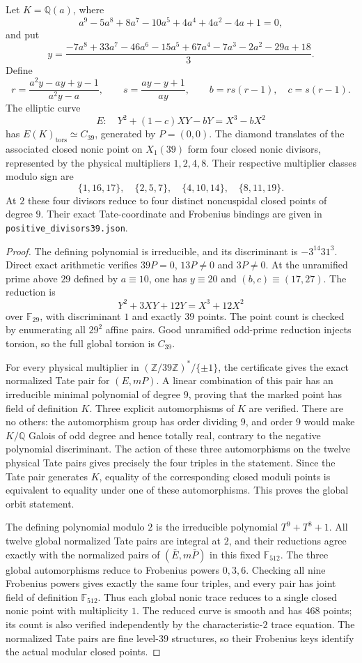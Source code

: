 \begin{lemma}\label{lem:nonic39-positive-witnesses}
Let $K=\mathbb Q(a)$, where
\[
 a^9-5a^8+8a^7-10a^5+4a^4+4a^2-4a+1=0,
\]
and put
\[
 y=\frac{-7a^8+33a^7-46a^6-15a^5+67a^4-7a^3-2a^2-29a+18}{3}.
\]
Define
\[
 r=\frac{a^2y-ay+y-1}{a^2y-a},\qquad
 s=\frac{ay-y+1}{ay},\qquad
 b=rs(r-1),\quad c=s(r-1).
\]
The elliptic curve
\[
 E:\quad Y^2+(1-c)XY-bY=X^3-bX^2
\]
has $E(K)_{\mathrm{tors}}\simeq C_{39}$, generated by $P=(0,0)$.
The diamond translates of the associated closed nonic point on
$X_1(39)$ form four closed nonic divisors, represented by the
physical multipliers $1,2,4,8$.
Their respective multiplier classes modulo sign are
\[
 \{1,16,17\},\quad \{2,5,7\},\quad
 \{4,10,14\},\quad \{8,11,19\}.
\]
At $2$ these four divisors reduce to four distinct noncuspidal closed
points of degree $9$. Their exact Tate-coordinate and Frobenius
bindings are given in \texttt{positive\_divisors39.json}.
\end{lemma}
\begin{proof}
The defining polynomial is irreducible, and its discriminant is
$-3^{14}31^3$. Direct exact arithmetic verifies
$39P=0$, $13P\ne0$ and $3P\ne0$.
At the unramified prime above $29$ defined by $a\equiv10$, one has
$y\equiv20$ and $(b,c)\equiv(17,27)$.
The reduction is
\[
 Y^2+3XY+12Y=X^3+12X^2
\]
over $\mathbb F_{29}$, with discriminant $1$ and exactly $39$ points.
The point count is checked by enumerating all $29^2$ affine pairs.
Good unramified odd-prime reduction injects torsion, so the full
global torsion is $C_{39}$.

For every physical multiplier in
$(\mathbb Z/39\mathbb Z)^*/\{\pm1\}$, the certificate gives the exact
normalized Tate pair for $(E,mP)$. A linear combination of this pair
has an irreducible minimal polynomial of degree $9$, proving that
the marked point has field of definition $K$.
Three explicit automorphisms of $K$ are verified.
There are no others: the automorphism group has order dividing $9$,
and order $9$ would make $K/\mathbb Q$ Galois of odd degree and hence
totally real, contrary to the negative polynomial discriminant.
The action of these three automorphisms on the twelve physical
Tate pairs gives precisely the four triples in the statement.
Since the Tate pair generates $K$, equality of the corresponding
closed moduli points is equivalent to equality under one of these
automorphisms. This proves the global orbit statement.

The defining polynomial modulo $2$ is the irreducible polynomial
$T^9+T^8+1$. All twelve global normalized Tate pairs are integral at
$2$, and their reductions agree exactly with the normalized pairs
of $(\bar E,m\bar P)$ in this fixed $\mathbb F_{512}$.
The three global automorphisms reduce to Frobenius powers $0,3,6$.
Checking all nine Frobenius powers gives exactly the same four
triples, and every pair has joint field of definition
$\mathbb F_{512}$. Thus each global nonic trace reduces to a single
closed nonic point with multiplicity $1$.
The reduced curve is smooth and has $468$ points; its count is also
verified independently by the characteristic-$2$ trace equation.
The normalized Tate pairs are fine level-$39$ structures, so their
Frobenius keys identify the actual modular closed points.
\end{proof}
